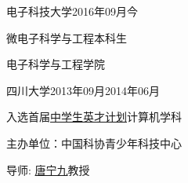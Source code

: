 
\begin{eduitem}{电子科技大学}{}{2016年09月}{今}
\item 微电子科学与工程本科生
\item 电子科学与工程学院
\end{eduitem}

\begin{eduitem}{四川大学}{}{2013年09月}{2014年06月}
\item 入选首届\href{http://ycjh.org}{中学生英才计划}计算机学科
\item 主办单位：中国科协青少年科技中心
\item 导师: \href{http://cs.scu.edu.cn/info/1074/3930.htm}{唐宁九}教授
\end{eduitem}


\endinput